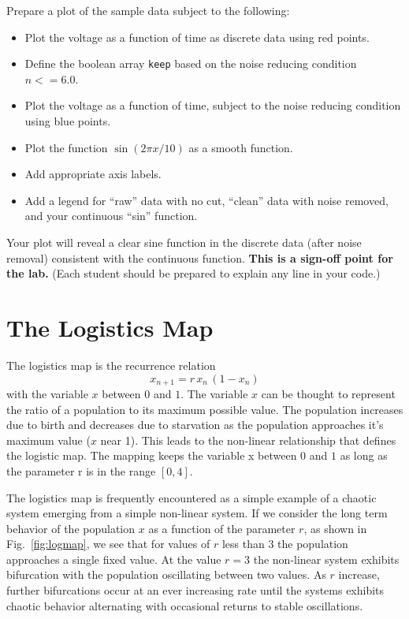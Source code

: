 \noindent
\begin{plot} \end{plot}
Prepare a plot of the sample data subject to the following:
\begin{itemize}
 \item Plot the voltage as a function of time as discrete data using red points.
 \item Define the boolean array {\tt keep} based on the noise reducing condition $n<=6.0$.
 \item Plot the voltage as a function of time, subject to the noise reducing condition using blue points.
 \item Plot the function $\sin(2 \pi x / 10)$ as a smooth function.
 \item Add appropriate axis labels.
 \item Add a legend for ``raw'' data with no cut, ``clean'' data with noise removed, and your continuous ``sin'' function.   
\end{itemize}
Your plot will reveal a clear sine function in the discrete data (after noise removal) consistent with the continuous function.  {\bf This is a sign-off point for the lab.}   (Each student should be prepared to explain any line in your code.)

\section{The Logistics Map}
The logistics map is the recurrence relation
\begin{displaymath}
x_{n+1} = r \, x_n \, (1 - x_n)
\end{displaymath}
with the variable $x$ between $0$ and $1$.  The variable $x$ can be thought to represent the ratio of a population to its maximum possible value.  The population increases due to birth and decreases due to starvation as the population approaches it's maximum value ($x$ near 1).  This leads to the non-linear relationship that defines the logistic map.   The mapping keeps the variable x between $0$ and $1$ as long as the parameter r is in the range $[0,4]$.

The logistics map is frequently encountered as a simple example of a chaotic system emerging from a simple non-linear system.  If we consider the long term behavior of the population $x$ as a function of the parameter $r$, as shown in Fig.~\ref{fig:logmap}, we see that for values of $r$ less than $3$ the population approaches a single fixed value.  At the value $r=3$ the non-linear system exhibits bifurcation with the population oscillating between two values.  As $r$ increase, further bifurcations occur at an ever increasing rate until the systems exhibits chaotic behavior alternating with occasional returns to stable oscillations.

